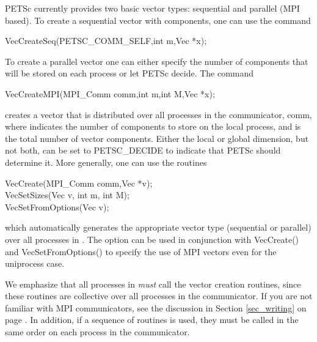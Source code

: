 PETSc currently provides two basic vector types: sequential and parallel
(MPI based). To create a sequential vector with  components,
one can
use the command
\begin{tabbing}
  VecCreateSeq(PETSC\_COMM\_SELF,int m,Vec *x);
\end{tabbing}
To create a parallel vector one can either specify the number of
components that will be stored on each process or let PETSc decide.
The command
\begin{tabbing}
  VecCreateMPI(MPI\_Comm comm,int m,int M,Vec *x);
\end{tabbing}
creates a vector that is distributed over all processes in the communicator,
comm, where  indicates the number
of components to store on the local process, and  is the
total number of vector components.  Either the local or global
dimension, but not both, can be set to PETSC\_DECIDE to
 indicate that PETSc should determine it.
More generally, one can use the routines
\begin{tabbing}
  VecCreate(MPI\_Comm comm,Vec *v);\\
  VecSetSizes(Vec v, int m, int M);\\
  VecSetFromOptions(Vec v);
\end{tabbing}
which automatically generates the appropriate vector type
(sequential or parallel) over all processes in .
The option   can be used in conjunction with
VecCreate() and VecSetFromOptions() to specify the use of MPI 
vectors even for the uniprocess case.

We emphasize that all processes in  {\em must} call the
vector creation routines, since these routines are collective over all
processes in the communicator. If you are not familiar with MPI communicators,
see the discussion in Section \ref{sec_writing} on page \pageref{sec_writing}.
In addition, if a sequence of  routines is used, they must be called in the same
order on each process in the communicator.

